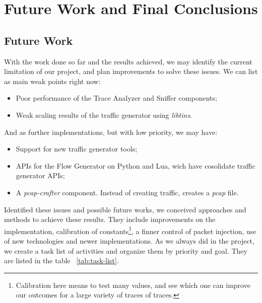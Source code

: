 \chapter{Future Work and Final Conclusions}\label{ch:conclusion}


\section{Future Work}

With the work done so far and the results achieved, we may identify the current limitation of our project, and plan improvements to solve these issues. 
We can list as  main weak points right now:

\begin{itemize}
    \item Poor performance of the Trace Analyzer and Sniffer components;
    \item Weak scaling results of the traffic generator using \textit{libtins}.
\end{itemize}

And as further implementations, but with low priority, we may have:

\begin{itemize}
    \item Support for new traffic generator tools;
    \item APIs for the Flow Generator on  Python and Lua, wich have cosolidate traffic generator APIs;
    \item A \textit{pcap-crafter} component. Instead of creating traffic, creates a \textit{pcap} file.
\end{itemize}

Identified these issues and possible future works, we conceived approaches and methods to achieve these results. They include improvements on the implementation,  calibration of constants\footnote{Calibration here means to test many values, and see which one can improve our outcomes for a large variety of traces of traces.}, a finner control of packet injection, use of new technologies and newer implementations. As we always did in the project, we create a task list of activities and organize them by priority and goal. They are listed in the table ~\ref{tab:task-list}.  


